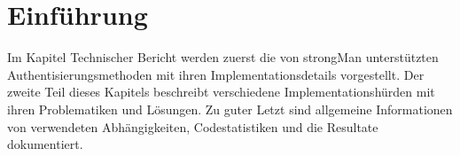 \section{Einführung}
Im Kapitel Technischer Bericht werden zuerst die von strongMan unterstützten Authentisierungsmethoden mit ihren Implementationsdetails vorgestellt. Der zweite Teil dieses Kapitels beschreibt verschiedene Implementationshürden mit ihren Problematiken und Lösungen. Zu guter Letzt sind allgemeine Informationen von verwendeten Abhängigkeiten, Codestatistiken und die Resultate dokumentiert.